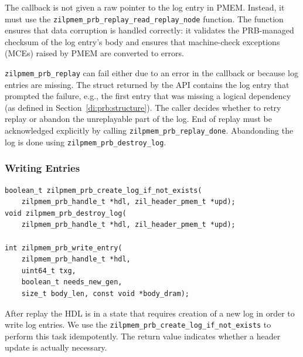 \documentclass[12pt,a4paper,twoside]{book}
\begin{document}
The callback is not given a raw pointer to the log entry in PMEM.
Instead, it must use the \lstinline{zilpmem_prb_replay_read_replay_node} function.
The function ensures that data corruption is handled correctly:
it validates the PRB-managed checksum of the log entry's body and ensures that machine-check exceptions (MCEs) raised by PMEM are converted to errors.

\lstinline{zilpmem_prb_replay} can fail either due to an error in the callback or because log entries are missing.
The struct returned by the API contains the log entry that prompted the failure, e.g., the first entry that was missing a logical dependency (as defined in Section~\ref{di:prb:structure}).
The caller decides whether to retry replay or abandon the unreplayable part of the log.
End of replay must be acknowledged explicitly by calling \lstinline{zilpmem_prb_replay_done}.
Abandonding the log is done using \lstinline{zilpmem_prb_destroy_log}.


\subsubsection{Writing Entries}

\begin{lstlisting}
boolean_t zilpmem_prb_create_log_if_not_exists(
    zilpmem_prb_handle_t *hdl, zil_header_pmem_t *upd);
void zilpmem_prb_destroy_log(
    zilpmem_prb_handle_t *hdl, zil_header_pmem_t *upd);

int zilpmem_prb_write_entry(
    zilpmem_prb_handle_t *hdl,
    uint64_t txg,
    boolean_t needs_new_gen,
    size_t body_len, const void *body_dram);
\end{lstlisting}

After replay the HDL is in a state that requires creation of a new log in order to write log entries.
We use the \lstinline{zilpmem_prb_create_log_if_not_exists} to perform this task idempotently.
The return value indicates whether a header update is actually necessary.
\end{document}
